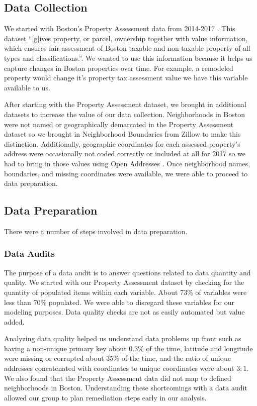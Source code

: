 \documentclass[12pt]{article}
\begin{document}
\subsection{Data Collection}

We started with Boston's Property Assessment data from 2014-2017
\cite{Property49:online}. This dataset ``[g]ives property, or parcel,
ownership together with value information, which ensures fair assessment
of Boston taxable and non-taxable property of all types and
classifications.''\cite{Property49:online}. We wanted to use this
information because it helps us capture changes in Boston properties
over time. For example, a remodeled property would change it's property
tax assessment value we have this variable available to us.

After starting with the Property Assessment dataset, we brought in
additional datasets to increase the value of our data collection.
Neighborhoods in Boston were not named or geographically demarcated in
the Property Assessment dataset so we brought in Neighborhood Boundaries
from Zillow \cite{ZillowNe81:online} to make this distinction.
Additionally, geographic coordinates for each assessed property's address
were occasionally not coded correctly or included at all for 2017 so we 
had to bring in those values using Open Addresses
\cite{OpenAddr24:online}. Once neighborhood names, boundaries, and missing
coordinates were available, we were able to proceed to data preparation.

\subsection{Data Preparation}

There were a number of steps involved in data preparation.

\subsubsection{Data Audits}

The purpose of a data audit is to answer questions related to data
quantity and quality. We started with our Property Assessment dataset
by checking for the quantity of populated items within each variable.
About 73\% of variables were less than 70\% populated. We were able to
disregard these variables for our modeling purposes. Data quality checks
are not as easily automated but value added.

Analyzing data quality helped us understand data problems up front
such as having a non-unique primary key about $0.3\%$ of the time,
latitude and longitude were missing or corrupted about 35\% of the time,
and the ratio of unique addresses concatenated with coordinates to
unique coordinates were about $3:1$. We also found that the Property
Assessment data did not map to defined neighborhoods in Boston.
Understanding these shortcomings with a data audit allowed our group
to plan remediation steps early in our analysis.
\end{document}
